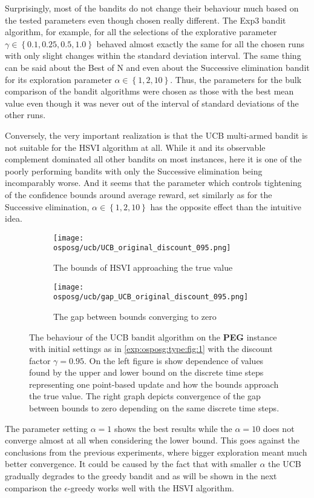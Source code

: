 \documentclass[../main.tex]{subfiles}
\begin{document}
Surprisingly, most of the bandits do not change their behaviour much based on the tested parameters even though chosen really different.
The Exp3 bandit algorithm, for example, for all the selections of the explorative parameter $\gamma \in \left\{0.1, 0.25, 0.5, 1.0\right\}$ behaved almost exactly the same for all the chosen runs with only slight changes within the standard deviation interval.
The same thing can be said about the Best of N and even about the Successive elimination bandit for its exploration parameter $\alpha \in \left\{1, 2, 10\right\}$.
Thus, the parameters for the bulk comparison of the bandit algorithms were chosen as those with the best mean value even though it was never out of the interval of standard deviations of the other runs.

Conversely, the very important realization is that the UCB multi-armed bandit is not suitable for the HSVI algorithm at all.
While it and its observable complement dominated all other bandits on most instances, here it is one of the poorly performing bandits with only the Successive elimination being incomparably worse.
And it seems that the parameter which controls tightening of the confidence bounds around average reward, set similarly as for the Successive elimination, $\alpha \in \left\{1, 2, 10\right\}$ has the opposite effect than the intuitive idea.
\begin{figure}[ht]
    \begin{subfigure}[b]{0.45\textwidth}
        \texttt{[image: osposg/ucb/UCB\_original\_discount\_095.png]}
        \caption{The bounds of HSVI approaching the true value}
        \label{exp:osposg:individual:ucb:bounds}
    \end{subfigure}
    \begin{subfigure}[b]{0.45\textwidth}
        \texttt{[image: osposg/ucb/gap\_UCB\_original\_discount\_095.png]}
        \caption{The gap between bounds converging to zero}
        \label{exp:osposg:individual:ucb:gap}
    \end{subfigure}
    \caption[UCB bandit with different parameter values]{
        The behaviour of the UCB bandit algorithm on the \textbf{PEG} instance with initial settings as in \ref{exp:osposg:type:fig:1} with the discount factor $\gamma = 0.95$.
        On the left figure is show dependence of values found by the upper and lower bound on the discrete time steps representing one point-based update and how the bounds approach the true value.
        The right graph depicts convergence of the gap between bounds to zero depending on the same discrete time steps.
    }
    \label{exp:osposg:individual:ucb}
\end{figure}
The parameter setting $\alpha = 1$ shows the best results while the $\alpha = 10$ does not converge almost at all when considering the lower bound.
This goes against the conclusions from the previous experiments, where bigger exploration meant much better convergence.
It could be caused by the fact that with smaller $\alpha$ the UCB gradually degrades to the greedy bandit and as will be shown in the next comparison the $\epsilon$-greedy works well with the HSVI algorithm.
\end{document}
